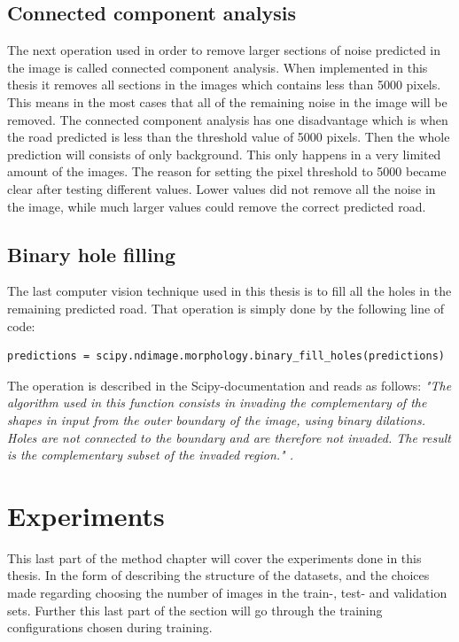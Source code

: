 \documentclass[USenglish]{ifimaster}  %
\begin{document}
\subsection{Connected component analysis}
The next operation used in order to remove larger sections of noise predicted in the image is called connected component analysis. When implemented in this thesis it removes all sections in the images which contains less than 5000 pixels. This means in the most cases that all of the remaining noise in the image will be removed. The connected component analysis has one disadvantage which is when the road predicted is less than the threshold value of 5000 pixels. Then the whole prediction will consists of only background. This only happens in a very limited amount of the images. The reason for setting the pixel threshold to 5000 became clear after testing different values. Lower values did not remove all the noise in the image, while much larger values could remove the correct predicted road. 
\subsection{Binary hole filling}
The last computer vision technique used in this thesis is to fill all the holes in the remaining predicted road. That operation is simply done by the following line of code:
\begin{verbatim}
predictions = scipy.ndimage.morphology.binary_fill_holes(predictions)
\end{verbatim}

The operation is described in the Scipy-documentation and reads as follows:
\newline
\newline
\textit{"The algorithm used in this function consists in invading the complementary of the shapes in input from the outer boundary of the image, using binary dilations. Holes are not connected to the boundary and are therefore not invaded. The result is the complementary subset of the invaded region." \cite{website:scipy}.} 

\section{Experiments}
This last part of the method chapter will cover the experiments done in this thesis. In the form of describing the structure of the datasets, and the choices made regarding choosing the number of images in the train-, test- and validation sets. Further this last part of the section will go through the training configurations chosen during training.  
\end{document}
